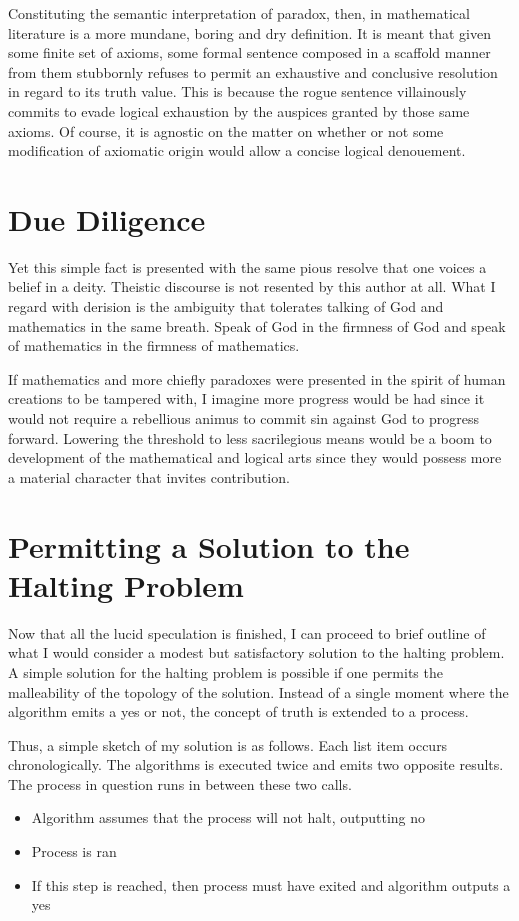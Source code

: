 \documentclass{article}
\begin{document}
	Constituting the semantic interpretation of paradox, then, in mathematical literature is a more mundane, boring and dry definition. It is meant that given some finite set of axioms, some formal sentence composed in a scaffold manner from them stubbornly refuses to permit an exhaustive and conclusive resolution in regard to its truth value. This is because the rogue sentence villainously commits to evade logical exhaustion by the auspices granted by those same axioms. Of course, it is agnostic on the matter on whether or not some modification of axiomatic origin would allow a concise logical denouement. 
	
	\section{Due Diligence}
	
	Yet this simple fact is presented with the same pious resolve that one voices a belief in a deity. Theistic discourse is not resented by this author at all. What I regard with derision is the ambiguity that tolerates talking of God and mathematics in the same breath. Speak of God in the firmness of God and speak of mathematics in the firmness of mathematics.
	
	If mathematics and more chiefly paradoxes were presented in the spirit of human creations to be tampered with, I imagine more progress would be had since it would not require a rebellious animus to commit sin against God to progress forward. Lowering the threshold to less sacrilegious means would be a boom to development of the mathematical and logical arts since they would possess more a material character that invites contribution.
	
	\section{Permitting a Solution to the Halting Problem}
	
	Now that all the lucid speculation is finished, I can proceed to brief outline of what I would consider a modest but satisfactory solution to the halting problem. A simple solution for the halting problem is possible if one permits the malleability of the topology of the solution. Instead of a single moment where the algorithm emits a yes or not, the concept of truth is extended to a process.
	
	Thus, a simple sketch of my solution is as follows. Each list item occurs chronologically. The algorithms is executed twice and emits two opposite results. The process in question runs in between these two calls.
	\begin{itemize}
		\item Algorithm assumes that the process will not halt, outputting no
		\item Process is ran
		\item If this step is reached, then process must have exited and algorithm outputs a yes
	\end{itemize}
\end{document}
